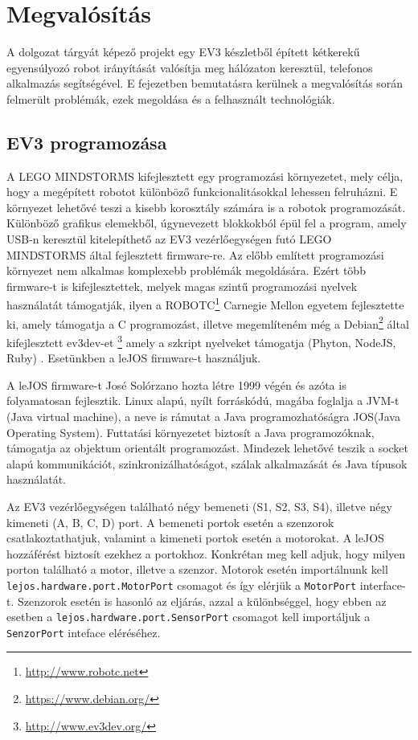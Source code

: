 \chapter{Megvalósítás}\label{ch:MEGVALOSITAS}
\begin{osszefoglal}
	A dolgozat tárgyát képező projekt egy EV3 készletből épített kétkerekű egyensúlyozó robot irányítását valósítja meg hálózaton keresztül, telefonos alkalmazás segítségével. E fejezetben bemutatásra kerülnek a megvalósítás során felmerült problémák, ezek megoldása és a felhasznált technológiák.
\end{osszefoglal}

\section{EV3 programozása}\label{sec:MEGVALOSITAS:lejos}
A LEGO MINDSTORMS kifejlesztett egy programozási környezetet, mely célja, hogy a megépített robotot különböző funkcionalitásokkal lehessen felruházni. E környezet lehetővé teszi a kisebb korosztály számára is a robotok programozását. Különböző grafikus elemekből, úgynevezett blokkokból épül fel a program, amely USB-n keresztül kitelepíthető az EV3 vezérlőegységen futó LEGO MINDSTORMS által fejlesztett firmware-re.
Az előbb említett programozási környezet nem alkalmas komplexebb problémák megoldására. Ezért több firmware-t is kifejlesztettek, melyek magas szintű programozási nyelvek használatát támogatják, ilyen a ROBOTC\footnote{\href {http://www.robotc.net}{http://www.robotc.net}} Carnegie Mellon egyetem fejlesztette ki, amely támogatja a C programozást, illetve megemlíteném még a Debian\footnote{\href{https://www.debian.org/}{https://www.debian.org/}} által kifejlesztett ev3dev-et \footnote{\href{http://www.ev3dev.org/}{http://www.ev3dev.org/}} amely a szkript nyelveket támogatja (Phyton, NodeJS, Ruby) . Esetünkben a leJOS firmware-t használjuk.

A leJOS firmware-t José Solórzano hozta létre 1999 végén és azóta is folyamatosan fejlesztik. Linux alapú, nyílt forráskódú, magába foglalja a JVM-t (Java virtual machine), a neve is rámutat a Java programozhatóságra JOS(Java Operating System). Futtatási környezetet biztosít a Java programozóknak, támogatja az objektum orientált programozást. Mindezek lehetővé teszik a socket alapú kommunikációt, szinkronizálhatóságot, szálak alkalmazását és Java típusok használatát.

Az EV3 vezérlőegységen található négy bemeneti (S1, S2, S3, S4), illetve négy kimeneti (A, B, C, D) port. A bemeneti portok esetén a szenzorok csatlakoztathatjuk, valamint a kimeneti portok esetén a motorokat. A leJOS hozzáférést biztosít ezekhez a portokhoz. Konkrétan meg kell adjuk, hogy milyen porton található a motor, illetve a szenzor. Motorok esetén importálnunk kell \texttt{lejos.hardware.port.MotorPort} csomagot és így elérjük a \texttt{MotorPort} interface-t. Szenzorok esetén is hasonló az eljárás, azzal a különbséggel, hogy ebben az esetben a \texttt{lejos.hardware.port.SensorPort} csomagot kell importáljuk a \texttt{SenzorPort} inteface eléréséhez.

